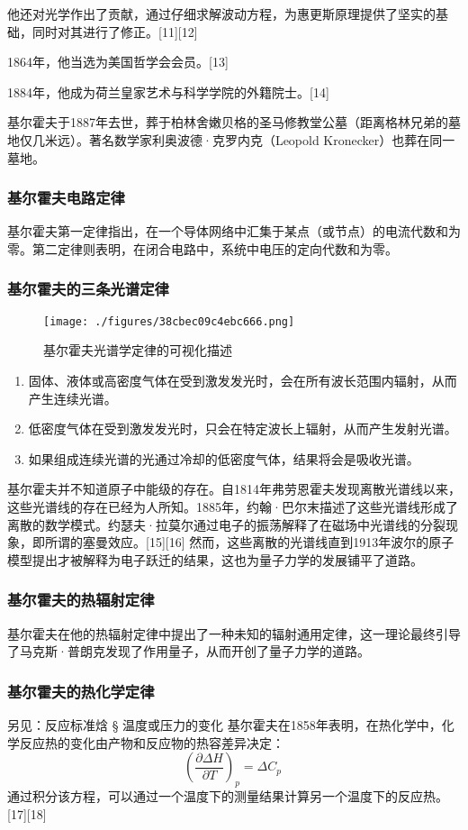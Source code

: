 他还对光学作出了贡献，通过仔细求解波动方程，为惠更斯原理提供了坚实的基础，同时对其进行了修正。[11][12]

1864年，他当选为美国哲学会会员。[13] 

1884年，他成为荷兰皇家艺术与科学学院的外籍院士。[14]

基尔霍夫于1887年去世，葬于柏林舍嫩贝格的圣马修教堂公墓（距离格林兄弟的墓地仅几米远）。著名数学家利奥波德·克罗内克（Leopold Kronecker）也葬在同一墓地。
\subsubsection{基尔霍夫电路定律}  
基尔霍夫第一定律指出，在一个导体网络中汇集于某点（或节点）的电流代数和为零。第二定律则表明，在闭合电路中，系统中电压的定向代数和为零。
\subsubsection{基尔霍夫的三条光谱定律}
\begin{figure}[ht]
\centering
\texttt{[image: ./figures/38cbec09c4ebc666.png]}
\caption{基尔霍夫光谱学定律的可视化描述} \label{fig_JRHF_3}
\end{figure}
\begin{enumerate}
\item 固体、液体或高密度气体在受到激发发光时，会在所有波长范围内辐射，从而产生连续光谱。  
\item 低密度气体在受到激发发光时，只会在特定波长上辐射，从而产生发射光谱。  
\item 如果组成连续光谱的光通过冷却的低密度气体，结果将会是吸收光谱。
\end{enumerate}
基尔霍夫并不知道原子中能级的存在。自1814年弗劳恩霍夫发现离散光谱线以来，这些光谱线的存在已经为人所知。1885年，约翰·巴尔末描述了这些光谱线形成了离散的数学模式。约瑟夫·拉莫尔通过电子的振荡解释了在磁场中光谱线的分裂现象，即所谓的塞曼效应。[15][16] 然而，这些离散的光谱线直到1913年波尔的原子模型提出才被解释为电子跃迁的结果，这也为量子力学的发展铺平了道路。
\subsubsection{基尔霍夫的热辐射定律}
基尔霍夫在他的热辐射定律中提出了一种未知的辐射通用定律，这一理论最终引导了马克斯·普朗克发现了作用量子，从而开创了量子力学的道路。
\subsubsection{基尔霍夫的热化学定律} 
另见：反应标准焓 § 温度或压力的变化  
基尔霍夫在1858年表明，在热化学中，化学反应热的变化由产物和反应物的热容差异决定：  
\[
\left(\frac{\partial \Delta H}{\partial T}\right)_p = \Delta C_p~
\]
通过积分该方程，可以通过一个温度下的测量结果计算另一个温度下的反应热。[17][18]  
